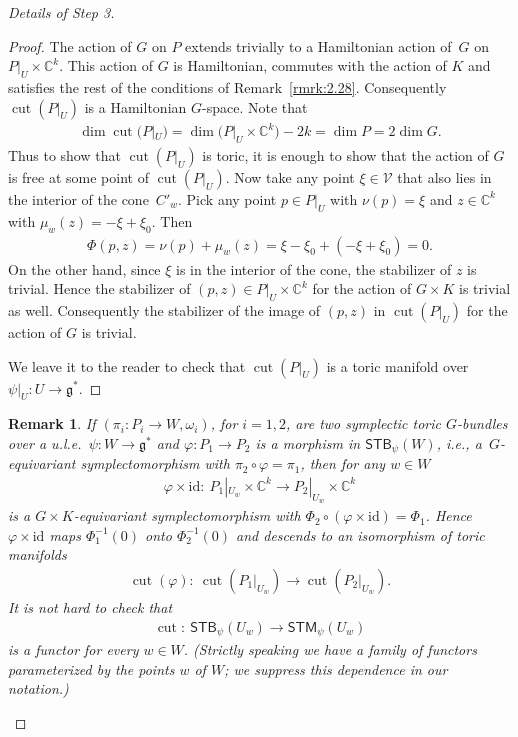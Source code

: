 \documentclass[pdftex]{sigma}
\numberwithin{equation}{section}
\newtheorem{Remark}[Lemma]{Remark}
\begin{document}
\begin{proof}[Details of Step 3]
\begin{proof}
The action of $G$ on $P$ extends trivially to a Hamiltonian action of~$G$ on $P|_U\times {\mathbb C}^k$.  This action of $G$ is Hamiltonian, commutes
with the action of $K$ and satisf\/ies the rest of the conditions of
Remark~\ref{rmrk:2.28}.  Consequently $\operatorname{cut}(P|_U)$ is a Hamiltonian
$G$-space.  Note that
\begin{gather*}
\dim \operatorname{cut}(P|_U) = \dim \big(P|_U \times {\mathbb C}^k\big) - 2k = \dim P = 2\dim G.
\end{gather*}
Thus to show that $\operatorname{cut}(P|_U)$ is toric, it is enough to show
that the action of $G$ is free at some point of $\operatorname{cut}(P|_U) $.  Now
take any point $\xi \in {\mathcal V}$ that also lies in the interior of the
cone~$C'_w$.  Pick any point $p\in P|_U$ with $\nu(p) = \xi$ and $z\in
{\mathbb C}^k$ with $\mu_w(z) = -\xi +\xi_0$.  Then
\begin{gather*}
\Phi(p,z) = \nu(p)+\mu_w(z) = \xi -\xi_0 +(-\xi +\xi_0) =0.
\end{gather*}
  On the other hand, since
$\xi$ is in the interior of the cone, the stabilizer of $z$ is
trivial.  Hence the stabilizer of $(p,z) \in P|_U\times {\mathbb C}^k$ for the
action of $G\times K$ is trivial as well. Consequently the stabilizer
of the image of $(p,z)$ in $\operatorname{cut}(P|_U)$ for the action of $G$ is
trivial.

We leave it to the reader to check that $\operatorname{cut}(P|_U)$ is a toric
manifold over $\psi|_U\colon U\to {\mathfrak g}^*$.
\end{proof}

\begin{Remark}
  If $(\pi_i\colon P_i\to W, \omega_i)$, for $i=1,2$, are two symplectic toric
  $G$-bundles over a u.l.e.\ $\psi\colon W\to {\mathfrak g}^*$ and
  $\varphi\colon P_1\to P_2$ is a morphism in ${\textsf{STB}}_\psi(W)$, i.e., a~$G$-equivariant symplectomorphism with $\pi_2 \circ \varphi =
  \pi_1$, then for any $w\in W$
\begin{gather*}
\varphi \times \text{id}\colon \  P_1|_{U_w}\times {\mathbb C}^k \to P_2|_{U_w}\times {\mathbb C}^k
\end{gather*}
is a $G\times K$-equivariant symplectomorphism with $\Phi_2\circ
(\varphi \times \text{id}) = \Phi_1$.
Hence $\varphi \times \text{id}$ maps $\Phi_1^{-1} (0)$
onto $\Phi_2^{-1} (0)$ and descends to an isomorphism of toric
manifolds
\begin{gather*}
\operatorname{cut}(\varphi)\colon \ \operatorname{cut}(P_1|_{U_w}) \to \operatorname{cut}(P_2|_{U_w}).
\end{gather*}
It is not hard to check that
\begin{gather*}
\operatorname{cut}\colon \  {\textsf{STB}}_\psi (U_w)\to {\textsf{STM}}_\psi (U_w)
\end{gather*}
is a functor for every $w\in W$.  (Strictly speaking we have a family of
functors parameterized by the points $w$ of $W$; we suppress this
dependence in our notation.)
\end{Remark}


\end{proof}
\end{document}
